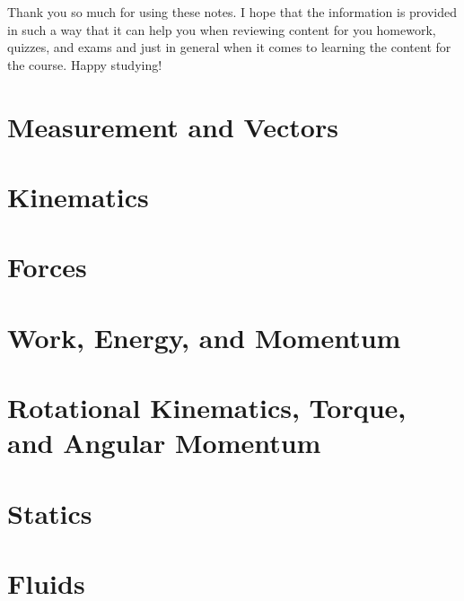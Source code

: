 \documentclass{package/notes}
\begin{document}
Thank you so much for using these notes. I hope that the information is provided in such a way that it can help you when reviewing content for you homework, quizzes, and exams and just in general when it comes to learning the content for the course. Happy studying!

\newpage


\chapter{Measurement and Vectors}



\chapter{Kinematics}



\chapter{Forces}



\chapter{Work, Energy, and Momentum}



\chapter{Rotational Kinematics, Torque, and Angular Momentum}



\chapter{Statics}



\chapter{Fluids}

\end{document}
